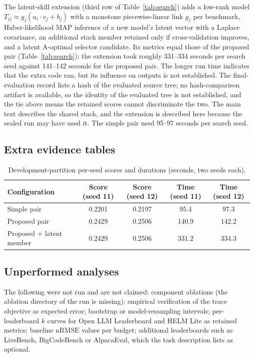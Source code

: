 \documentclass{article}
\newcommand{\nrmse}{\mathrm{nRMSE}}
\begin{document}
\noindent The latent-skill extension (third row of Table~\ref{tab:search}) adds a low-rank model $T_{ij}\approx g_j(u_i\cdot v_j+b_j)$ with a monotone piecewise-linear link $g_j$ per benchmark, Huber-likelihood MAP inference of a new model's latent vector with a Laplace covariance, an additional stack member retained only if cross-validation improves, and a latent A-optimal selector candidate. Its metrics equal those of the proposed pair (Table~\ref{tab:search}); the extension took roughly 331--334 seconds per search seed against 141--142 seconds for the proposed pair. %
The longer run time indicates that the extra code ran, but its influence on outputs is not established. The final-evaluation record lists a hash of the evaluated source tree; no hash-comparison artifact is available, so the identity of the evaluated tree is not established, and the tie above means the retained scores cannot discriminate the two. The main text describes the shared stack, and the extension is described here because the sealed run may have used it. The simple pair used 95--97 seconds per search seed. %

\subsection{Extra evidence tables}
\begin{table}[h]
\centering
\caption{Development-partition per-seed scores and durations (seconds, two seeds each).}
\label{tab:seeds}
\small
\begin{tabular}{lcccc}
\toprule
Configuration & Score (seed 11) & Score (seed 12) & Time (seed 11) & Time (seed 12)\\
\midrule
Simple pair & 0.2201 & 0.2197 & 95.4 & 97.3\\
Proposed pair & 0.2429 & 0.2506 & 140.9 & 142.2\\
Proposed + latent member & 0.2429 & 0.2506 & 331.2 & 334.3\\
\bottomrule
\end{tabular}
\end{table}

\subsection{Unperformed analyses}
The following were not run and are not claimed: component ablations (the ablation directory of the run is missing); empirical verification of the trace objective as expected error; bootstrap or model-resampling intervals; per-leaderboard $k$ curves for Open LLM Leaderboard and HELM Lite as retained metrics; baseline $\nrmse$ values per budget; additional leaderboards such as LiveBench, BigCodeBench or AlpacaEval, which the task description lists as optional.
\end{document}
